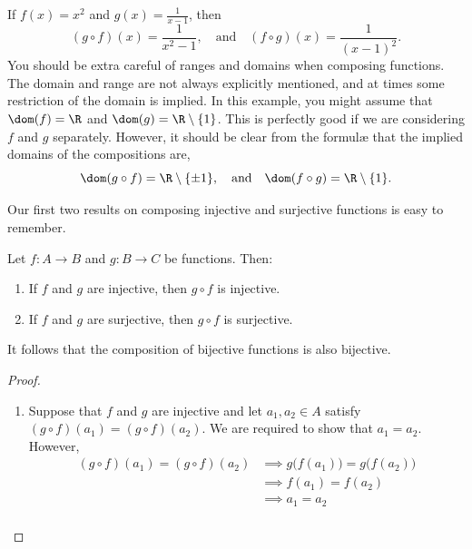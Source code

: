 \begin{example}
If $f(x)=x^2$ and $g(x)=\frac 1{x-1}$, then
\[(g\circ f)(x)=\frac 1{x^2-1},\quad\text{and}\quad(f\circ g)(x)=\frac 1{(x-1)^2}.\]
You should be extra careful of ranges and domains when composing functions. The domain and range are not always explicitly mentioned, and at times some restriction of the domain is implied. In this example, you might assume that $\dom(f)=\R$ and $\dom(g)=\R\setminus\{1\}$. This is perfectly good if we are considering $f$ and $g$ separately. However, it should be clear from the formulæ that the implied domains of the compositions are,
\[\dom(g\circ f)=\R\setminus\{\pm 1\},\quad\text{and}\quad\dom(f\circ g)=\R\setminus\{1\}.\]
\end{example}

Our first two results on composing injective and surjective functions is easy to remember.

\begin{thm}\label{thm:compinjsurj}
Let $f:A\to B$ and $g:B\to C$ be functions. Then:
\begin{enumerate}
  \item If $f$ and $g$ are injective, then $g\circ f$ is injective.
  \item If $f$ and $g$ are surjective, then $g\circ f$ is surjective.
\end{enumerate}
It follows that the composition of bijective functions is also bijective.
\end{thm}

\begin{proof}
\begin{enumerate}
  \item Suppose that $f$ and $g$ are injective and let $a_1,a_2\in A$ satisfy $(g\circ f)(a_1)=(g\circ f)(a_2)$. We are required to show that $a_1=a_2$. However,
  \begin{align*}
  (g\circ f)(a_1)=(g\circ f)(a_2)&\implies g\big(f(a_1)\big)=g\big(f(a_2)\big)\\
  &\implies f(a_1)=f(a_2)\tag*{(since $g$ is injective)}\\
  &\implies a_1=a_2\tag*{(since $f$ is injective)}\\[-25pt]
  \end{align*}\qedhere
\end{enumerate}
\end{proof}

